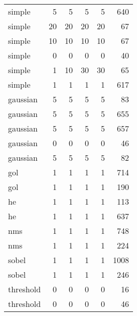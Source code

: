 \begin{tabular}{lrrrrr}
    simple &      5 &      5 &     5 &     5 &                640 \\
    simple &     20 &     20 &    20 &    20 &                 67 \\
    simple &     10 &     10 &    10 &    10 &                 67 \\
    simple &      0 &      0 &     0 &     0 &                 40 \\
    simple &      1 &     10 &    30 &    30 &                 65 \\
    simple &      1 &      1 &     1 &     1 &                617 \\
  gaussian &      5 &      5 &     5 &     5 &                 83 \\
  gaussian &      5 &      5 &     5 &     5 &                655 \\
  gaussian &      5 &      5 &     5 &     5 &                657 \\
  gaussian &      0 &      0 &     0 &     0 &                 46 \\
  gaussian &      5 &      5 &     5 &     5 &                 82 \\
       gol &      1 &      1 &     1 &     1 &                714 \\
       gol &      1 &      1 &     1 &     1 &                190 \\
        he &      1 &      1 &     1 &     1 &                113 \\
        he &      1 &      1 &     1 &     1 &                637 \\
       nms &      1 &      1 &     1 &     1 &                748 \\
       nms &      1 &      1 &     1 &     1 &                224 \\
     sobel &      1 &      1 &     1 &     1 &               1008 \\
     sobel &      1 &      1 &     1 &     1 &                246 \\
 threshold &      0 &      0 &     0 &     0 &                 16 \\
 threshold &      0 &      0 &     0 &     0 &                 46 \\
\bottomrule
\end{tabular}


